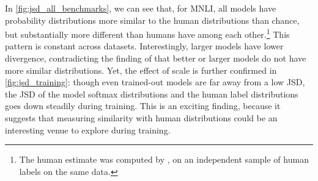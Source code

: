 In \cref{fig:jsd_all_benchmarks}, we can see that, for MNLI, all models have probability distributions more similar to the human distributions than chance, but substantially more different than humans have among each other.\footnote{The human estimate was computed by \citet{nie-etal-2020-learn}, on an independent sample of human labels on the same data.}
This pattern is constant across datasets.
Interestingly, larger models have lower divergence, contradicting the finding of \citet{nie-etal-2020-learn} that better or larger models do not have more similar distributions.
Yet, the effect of scale is further confirmed in \cref{fig:jsd_training}: though even trained-out models are far away from a low JSD, the JSD of the model softmax distributions and the human label distributions goes down steadily during training.
This is an exciting finding, because it suggests that measuring similarity with human distributions could be an interesting venue to explore during training.

% 

